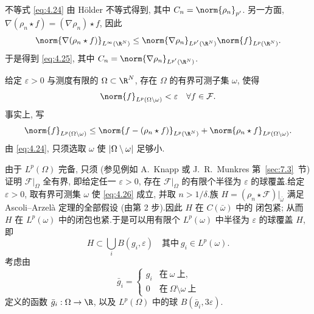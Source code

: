 不等式 \eqref{eq:4.24} 由 Hölder 不等式得到, 其中 $C_n=\norm{\rho_n}_{p'}$.
另一方面, $\nabla(\rho_n\star f)=(\nabla\rho_n)\star f$, 因此
\begin{equation*}
\norm{\nabla(\rho_n\star f)}_{L^\infty(\R^N)}
\le\norm{\nabla\rho_n}_{L^{p'}(\R^N)}\norm{f}_{L^p(\R^N)}.
\end{equation*}
于是得到 \eqref{eq:4.25}, 其中 $C_n=\norm{\nabla\rho_n}_{L^{p'}(\R^N)}$.

给定 $\varepsilon>0$ 与测度有限的 $\Omega\subset\R^N$, 存在
$\Omega$ 的有界可测子集 $\omega$, 使得
\begin{equation}
\norm{f}_{L^p(\Omega\setminus\omega)}<\varepsilon\quad\forall f\in\mathcal{F}.
\label{eq:4.26}
\end{equation}
事实上, 写
\begin{equation*}
\norm{f}_{L^p(\Omega\setminus\omega)}
\le\norm{f-(\rho_n\star f)}_{L^p(\R^N)}
+\norm{\rho_n\star f}_{L^p(\Omega\setminus\omega)}.
\end{equation*}
由 \eqref{eq:4.24}, 只须选取 $\omega$ 使 $\left|\Omega\setminus\omega\right|$ 足够小.

由于 $L^p(\Omega)$ 完备, 只须 (参见例如 A.~Knapp
 或 J.~R.~Munkres  第~\ref{sec:7.3}~节) 证明
$\mathcal{F}|_\Omega$ 全有界, 即给定任一 $\varepsilon>0$, 存在
$\mathcal{F}|_\Omega$ 的有限个半径为 $\varepsilon$ 的球覆盖.给定
$\varepsilon>0$, 取有界可测集 $\omega$ 使 \eqref{eq:4.26} 成立, 并取
$n>1/\delta$.族 $H=(\rho_n\star\mathcal{F})|_{\bar\omega}$ 满足
Ascoli--Arzel\`a 定理的全部假设 (由第 2 步).因此 $H$ 在 $C(\bar\omega)$ 中的
闭包紧; 从而 $H$ 在 $L^p(\omega)$ 中的闭包也紧.于是可以用有限个
$L^p(\omega)$ 中半径为 $\varepsilon$ 的球覆盖 $H$, 即
\begin{equation*}
H\subset\bigcup_iB(g_i,\varepsilon)\quad\text{其中}\ g_i\in L^p(\omega).
\end{equation*}
考虑由
\begin{equation*}
\bar g_i=\begin{cases}
g_i & \text{在}\ \omega\ \text{上},\\
0 & \text{在}\ \Omega\setminus\omega\ \text{上}
\end{cases}
\end{equation*}
定义的函数 $\bar g_i:\Omega\to\R$, 以及 $L^p(\Omega)$ 中的球
$B(\bar g_i,3\varepsilon)$.

